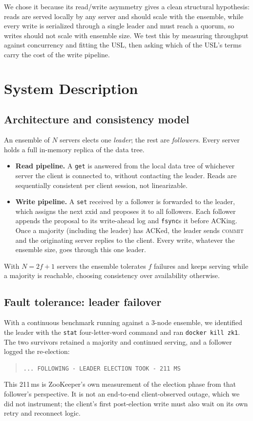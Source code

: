 \documentclass{llncs}
\begin{document}
We chose it because its read/write asymmetry gives a clean structural
hypothesis: reads are served locally by any server and should scale with
the ensemble, while every write is serialized through a single leader
and must reach a quorum, so writes should not scale with ensemble size.
We test this by measuring throughput against concurrency and fitting the
USL, then asking which of the USL's terms carry the cost of the write
pipeline.

\section{System Description}

\subsection{Architecture and consistency model}

An ensemble of $N$ servers elects one \emph{leader}; the rest are
\emph{followers}. Every server holds a full in-memory replica of the data
tree.
\begin{itemize}
  \item \textbf{Read pipeline.} A \texttt{get} is answered from the local
    data tree of whichever server the client is connected to, without
    contacting the leader. Reads are sequentially consistent per client
    session, not linearizable.
  \item \textbf{Write pipeline.} A \texttt{set} received by a follower is
    forwarded to the leader, which assigns the next zxid and proposes it to
    all followers. Each follower appends the proposal to its write-ahead
    log and \texttt{fsync}s it before ACKing. Once a majority (including
    the leader) has ACKed, the leader sends \textsc{commit} and the
    originating server replies to the client. Every write, whatever the
    ensemble size, goes through this one leader.
\end{itemize}
With $N=2f+1$ servers the ensemble tolerates $f$ failures and keeps serving
while a majority is reachable, choosing consistency over availability
otherwise.

\subsection{Fault tolerance: leader failover}
\label{sec:failover}

With a continuous benchmark running against a 3-node ensemble, we
identified the leader with the \texttt{stat} four-letter-word command and
ran \texttt{docker kill zk1}. The two survivors retained a majority and
continued serving, and a follower logged the re-election:
\begin{quote}
\texttt{... FOLLOWING - LEADER ELECTION TOOK - 211 MS}
\end{quote}
This 211\,ms is ZooKeeper's own measurement of the election phase from that
follower's perspective. It is not an end-to-end client-observed outage,
which we did not instrument; the client's first post-election write must
also wait on its own retry and reconnect logic.
\end{document}
